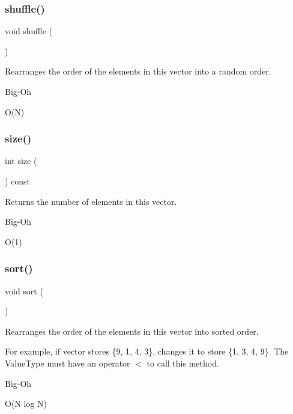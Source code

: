 \subsubsection{\texorpdfstring{shuffle()}{shuffle()}}
{\footnotesize\ttfamily void shuffle (\begin{DoxyParamCaption}{ }\end{DoxyParamCaption})}



Rearranges the order of the elements in this vector into a random order. 

\begin{DoxyRefDesc}{Big-\/\+Oh}
\item[\mbox{\hyperlink{BigOh__BigOh000134}{Big-\/\+Oh}}]O(\+N) \end{DoxyRefDesc}
\mbox{\label{classVector_af9593d4a5ff4274efaf429cb4f9e57cc}} 
\subsubsection{\texorpdfstring{size()}{size()}}
{\footnotesize\ttfamily int size (\begin{DoxyParamCaption}{ }\end{DoxyParamCaption}) const}



Returns the number of elements in this vector. 

\begin{DoxyRefDesc}{Big-\/\+Oh}
\item[\mbox{\hyperlink{BigOh__BigOh000133}{Big-\/\+Oh}}]O(1) \end{DoxyRefDesc}
\mbox{\label{classVector_a47fdc9eea42b6975cdc835bb2e08810e}} 
\subsubsection{\texorpdfstring{sort()}{sort()}}
{\footnotesize\ttfamily void sort (\begin{DoxyParamCaption}{ }\end{DoxyParamCaption})}



Rearranges the order of the elements in this vector into sorted order. 

For example, if vector stores \{9, 1, 4, 3\}, changes it to store \{1, 3, 4, 9\}. The Value\+Type must have an operator $<$ to call this method. \begin{DoxyRefDesc}{Big-\/\+Oh}
\item[\mbox{\hyperlink{BigOh__BigOh000135}{Big-\/\+Oh}}]O(\+N log N) \end{DoxyRefDesc}
\mbox{\label{classVector_a68d5113d5e35ad7906cb7d1707621e08}} 

